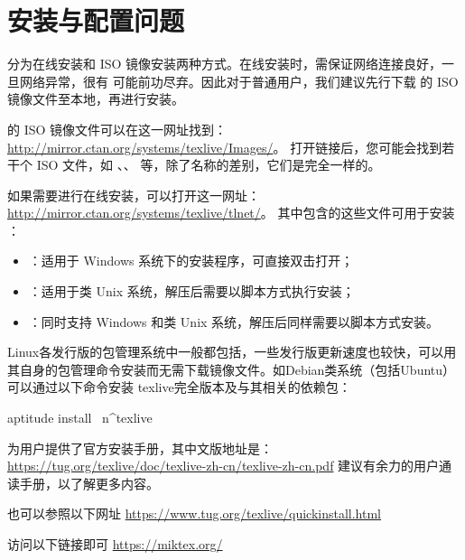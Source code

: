 
\section{安装与配置问题}
\label{sec:install}


\TeXLive{} 分为在线安装和 ISO 镜像安装两种方式。在线安装时，需保证网络连接良好，一旦网络异常，很有
可能前功尽弃。因此对于普通用户，我们建议先行下载 \TeXLive{} 的 ISO 镜像文件至本地，再进行安装。

\TeXLive{} 的 ISO 镜像文件可以在这一网址找到：\url{http://mirror.ctan.org/systems/texlive/Images/}。
打开链接后，您可能会找到若干个 ISO 文件，如 、、
 等，除了名称的差别，它们是完全一样的。

如果需要进行在线安装，可以打开这一网址：\url{http://mirror.ctan.org/systems/texlive/tlnet/}。
其中包含的这些文件可用于安装 \TeXLive{}：

\begin{itemize}
  \item {}：适用于 Windows 系统下的安装程序，可直接双击打开；
  \item {}：适用于类 Unix 系统，解压后需要以脚本方式执行安装；
  \item {}：同时支持 Windows 和类 Unix 系统，解压后同样需要以脚本方式安装。
\end{itemize}

Linux各发行版的包管理系统中一般都包括\TeXLive{}，一些发行版更新速度也较快，可以用
其自身的包管理命令安装而无需下载镜像文件。如Debian类系统（包括Ubuntu）可以通过以下命令安装
texlive完全版本及与其相关的依赖包：
\begin{shcode}
  aptitude install ~n^texlive
\end{shcode}



\TeXLive{} 为用户提供了官方安装手册，其中文版地址是：
\url{https://tug.org/texlive/doc/texlive-zh-cn/texlive-zh-cn.pdf}
建议有余力的用户通读手册，以了解更多内容。

也可以参照以下网址 \url{https://www.tug.org/texlive/quickinstall.html}


访问以下链接即可 \url{https://miktex.org/}

